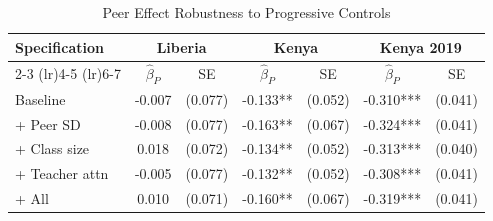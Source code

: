 \begin{table}[htbp]
\centering\small
\caption{Peer Effect Robustness to Progressive Controls}
\label{tab:peer_progressive}
\begin{tabular}{lcccccc}
\toprule
Specification & \multicolumn{2}{c}{Liberia} & \multicolumn{2}{c}{Kenya} & \multicolumn{2}{c}{Kenya 2019} \\
\cmidrule(lr){2-3} \cmidrule(lr){4-5} \cmidrule(lr){6-7}
 & $\hat{\beta}_P$ & SE & $\hat{\beta}_P$ & SE & $\hat{\beta}_P$ & SE \\
\midrule
Baseline & -0.007 & (0.077) & -0.133** & (0.052) & -0.310*** & (0.041) \\
+ Peer SD & -0.008 & (0.077) & -0.163** & (0.067) & -0.324*** & (0.041) \\
+ Class size & 0.018 & (0.072) & -0.134** & (0.052) & -0.313*** & (0.040) \\
+ Teacher attn & -0.005 & (0.077) & -0.132** & (0.052) & -0.308*** & (0.041) \\
+ All & 0.010 & (0.071) & -0.160** & (0.067) & -0.319*** & (0.041) \\
\bottomrule
\end{tabular}
\par\smallskip{}
\end{table}
